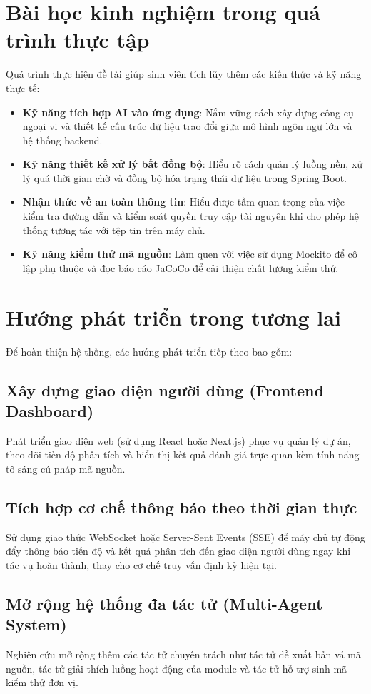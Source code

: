 \documentclass[12pt,a4paper]{report}
\begin{document}
\section{Bài học kinh nghiệm trong quá trình thực tập}
Quá trình thực hiện đề tài giúp sinh viên tích lũy thêm các kiến thức và kỹ năng thực tế:
\begin{itemize}
    \item \textbf{Kỹ năng tích hợp AI vào ứng dụng}: Nắm vững cách xây dựng công cụ ngoại vi và thiết kế cấu trúc dữ liệu trao đổi giữa mô hình ngôn ngữ lớn và hệ thống backend.
    \item \textbf{Kỹ năng thiết kế xử lý bất đồng bộ}: Hiểu rõ cách quản lý luồng nền, xử lý quá thời gian chờ và đồng bộ hóa trạng thái dữ liệu trong Spring Boot.
    \item \textbf{Nhận thức về an toàn thông tin}: Hiểu được tầm quan trọng của việc kiểm tra đường dẫn và kiểm soát quyền truy cập tài nguyên khi cho phép hệ thống tương tác với tệp tin trên máy chủ.
    \item \textbf{Kỹ năng kiểm thử mã nguồn}: Làm quen với việc sử dụng Mockito để cô lập phụ thuộc và đọc báo cáo JaCoCo để cải thiện chất lượng kiểm thử.
\end{itemize}

\section{Hướng phát triển trong tương lai}
Để hoàn thiện hệ thống, các hướng phát triển tiếp theo bao gồm:

\subsection{Xây dựng giao diện người dùng (Frontend Dashboard)}
Phát triển giao diện web (sử dụng React hoặc Next.js) phục vụ quản lý dự án, theo dõi tiến độ phân tích và hiển thị kết quả đánh giá trực quan kèm tính năng tô sáng cú pháp mã nguồn.

\subsection{Tích hợp cơ chế thông báo theo thời gian thực}
Sử dụng giao thức WebSocket hoặc Server-Sent Events (SSE) để máy chủ tự động đẩy thông báo tiến độ và kết quả phân tích đến giao diện người dùng ngay khi tác vụ hoàn thành, thay cho cơ chế truy vấn định kỳ hiện tại.

\subsection{Mở rộng hệ thống đa tác tử (Multi-Agent System)}
Nghiên cứu mở rộng thêm các tác tử chuyên trách như tác tử đề xuất bản vá mã nguồn, tác tử giải thích luồng hoạt động của module và tác tử hỗ trợ sinh mã kiểm thử đơn vị.
\end{document}
